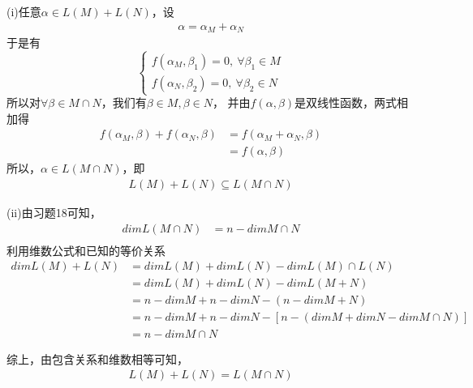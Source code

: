 \documentclass{article}
\begin{document}
\begin{itemize}
        (i)任意$\alpha \in L(M) + L(N)$，设
        \begin{align*}
          \alpha = \alpha_M + \alpha_N
        \end{align*}
        于是有
        \begin{equation*}
          \begin{cases*}
            f(\alpha_M, \beta_1) = 0, \ \forall \beta_1 \in M \\
            f(\alpha_N, \beta_2) = 0, \ \forall \beta_2 \in N
          \end{cases*}
        \end{equation*}
        所以对$\forall \beta \in M \cap N$，我们有$\beta \in M, \beta \in N$，
        并由$f(\alpha, \beta)$是双线性函数，两式相加得
        \begin{align*}
          f(\alpha_M, \beta) + f(\alpha_N, \beta)
           & = f(\alpha_M + \alpha_N, \beta) \\
           & = f(\alpha, \beta)
        \end{align*}
        所以，$\alpha \in L(M \cap N)$，即
        \begin{align*}
          L(M) + L(N) \subseteq L(M \cap N)
        \end{align*}

        (ii)由习题18可知，
        \begin{align*}
          dim L(M \cap N) & = n - dim M \cap N \\
        \end{align*}
        利用维数公式和已知的等价关系
        \begin{align*}
          dim L (M) + L(N)
           & = dim L(M) + dim L(N) - dim L (M) \cap L(N)                    \\
           & = dim L(M) + dim L(N) - dim L(M + N)                           \\
           & = n - dim M + n - dim N - (n - dim M + N)                      \\
           & = n - dim M + n - dim N - [n - (dim M + dim N - dim M \cap N)] \\
           & = n -  dim M \cap N
        \end{align*}

        综上，由包含关系和维数相等可知，
        \begin{align*}
          L(M) + L(N) = L(M \cap N)
        \end{align*}
\end{itemize}
\end{document}
